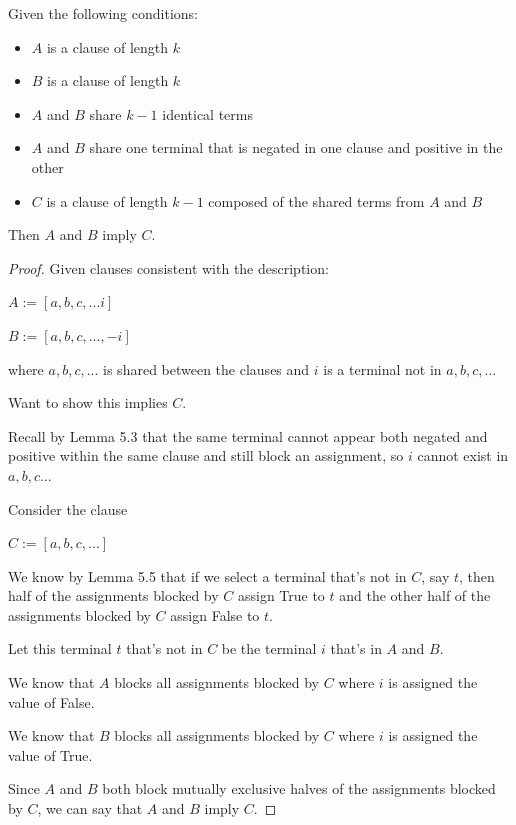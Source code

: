 \documentclass[manuscript]{acmart}
\begin{document}
    \begin{lemma}[Reduction]
        Given the following conditions:
        \begin{itemize}
            \item $A$ is a clause of length $k$
            \item $B$ is a clause of length $k$
            \item $A$ and $B$ share $k-1$ identical terms
            \item $A$ and $B$ share one terminal that is negated in one clause
            and positive in the other
            \item $C$ is a clause of length $k-1$ composed of the shared terms
            from $A$ and $B$
        \end{itemize}
        Then $A$ and $B$ imply $C$.
    \end{lemma}
    \begin{proof}
        Given clauses consistent with the description:

        $A := [a, b, c, ... i]$

        $B := [a, b, c, ..., -i]$

        where $a, b, c, ...$ is shared between the clauses and $i$ is a terminal not in $a, b, c, ...$

        Want to show this implies $C$.

        Recall by Lemma 5.3 that the same terminal cannot appear both negated and positive within the same clause and still block an assignment, so $i$ cannot exist in $a, b, c...$

        Consider the clause

        $C := [a, b, c, ...]$

        We know by Lemma 5.5 that if we select a terminal that's not in $C$, say $t$, then half of the assignments blocked by $C$ assign True to $t$ and the other half of the assignments blocked by $C$ assign False to $t$.

        Let this terminal $t$ that's not in $C$ be the terminal $i$ that's in $A$ and $B$.

        We know that $A$ blocks all assignments blocked by $C$ where $i$ is assigned the value of False.

        We know that $B$ blocks all assignments blocked by $C$ where $i$ is assigned the value of True.

        Since $A$ and $B$ both block mutually exclusive halves of the assignments blocked by $C$, we can say that $A$ and $B$ imply $C$.
    \end{proof}
\end{document}
